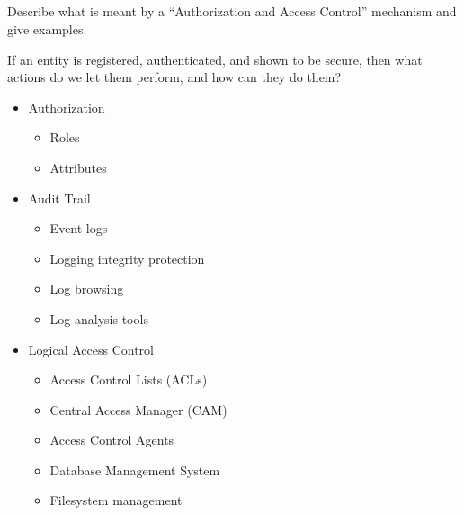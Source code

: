 \begin{questions}
\begin{parts}
  \part{} Describe what is meant by a ``Authorization and Access Control'' mechanism and give examples.
    \begin{solution}
      If an entity is registered, authenticated, and shown to be secure, then what actions do we let them perform, and how can they do them?
      \begin{itemize}[noitemsep]
      \item Authorization
        \begin{itemize}[noitemsep]
        \item Roles
        \item Attributes
        \end{itemize}
      \item Audit Trail
        \begin{itemize}[noitemsep]
        \item Event logs
        \item Logging integrity protection
        \item Log browsing
        \item Log analysis tools
        \end{itemize}
      \item Logical Access Control
        \begin{itemize}[noitemsep]
        \item Access Control Lists (ACLs)
        \item Central Access Manager (CAM)
        \item Access Control Agents
        \item Database Management System
        \item Filesystem management
        \end{itemize}
      \end{itemize}
    \end{solution}


\end{parts}
\end{questions}
